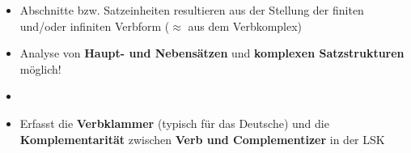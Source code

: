 \begin{frame}

\begin{itemize}
	\item Abschnitte bzw. Satzeinheiten resultieren aus der Stellung der finiten und/oder infiniten Verbform ($\approx$ aus dem Verbkomplex)
\end{itemize}

\begin{table}
\centering
{}
\end{table}

\end{frame}


\begin{frame}

\begin{itemize}
	\item Analyse von \textbf{Haupt- und Nebensätzen} und \textbf{komplexen Satzstrukturen} möglich!
	\item[]
	\item Erfasst die \textbf{Verbklammer} (typisch für das Deutsche) und
	die \textbf{Komplementarität} zwischen \textbf{Verb und Complementizer} in der LSK
\end{itemize}

\begin{table}
\centering
{}
\end{table}

\end{frame}


